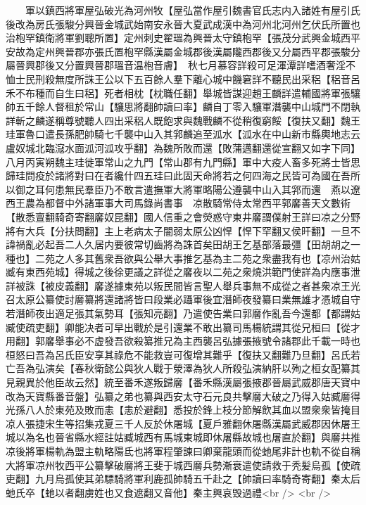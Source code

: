 　　軍以鎮西將軍屋弘破光為河州牧【屋弘當作屋引魏書官氏志内入諸姓有屋引氏後改為房氏張駿分興晉金城武始南安永晉大夏武成漢中為河州北河州乞伏氏所置也治枹罕鎮衛將軍劉聰所置】定州刺史翟瑥為興晉太守鎮枹罕【張茂分武興金城西平安故為定州興晉郡亦張氏置枹罕縣漢屬金城郡後漢屬隴西郡後又分屬西平郡張駿分屬晉興郡後又分置興晉郡瑥音温枹音膚】　秋七月慕容詳殺可足渾潭詳嗜酒奢淫不恤士民刑殺無度所誅王公以下五百餘人羣下離心城中饑窘詳不聽民出采稆【稆音呂禾不布種而自生曰稆】死者相枕【枕職任翻】舉城皆謀迎趙王麟詳遣輔國將軍張驤帥五千餘人督租於常山【驤思將翻帥讀曰率】麟自丁零入驤軍潛襲中山城門不閉執詳斬之麟遂稱尊號聽人四出采稆人既飽求與魏戰麟不從稍復窮餒【復扶又翻】魏王珪軍魯口遣長孫肥帥騎七千襲中山入其郛麟追至泒水【泒水在中山新市縣輿地志云盧奴城北臨滱水面泒河泒攻乎翻】為魏所敗而還【敗蒲邁翻還從宣翻又如字下同】八月丙寅朔魏主珪徙軍常山之九門【常山郡有九門縣】軍中大疫人畜多死將士皆思歸珪問疫於諸將對曰在者纔什四五珪曰此固天命將若之何四海之民皆可為國在吾所以御之耳何患無民羣臣乃不敢言遣撫軍大將軍略陽公遵襲中山入其郛而還　燕以遼西王農為都督中外諸軍事大司馬錄尚書事　凉散騎常侍太常西平郭黁善天文數術【散悉亶翻騎奇寄翻黁奴昆翻】國人信重之會熒惑守東井黁謂僕射王詳曰凉之分野將有大兵【分扶問翻】主上老病太子闇弱太原公凶悍【悍下罕翻又侯旰翻】一旦不諱禍亂必起吾二人久居内要彼常切齒將為誅首矣田胡王乞基部落最彊【田胡胡之一種也】二苑之人多其舊衆吾欲與公舉大事推乞基為主二苑之衆盡我有也【凉州治姑臧有東西苑城】得城之後徐更議之詳從之黁夜以二苑之衆燒洪範門使詳為内應事泄詳被誅【被皮義翻】黁遂據東苑以叛民間皆言聖人舉兵事無不成從之者甚衆凉王光召太原公纂使討黁纂將還諸將皆曰段業必躡軍後宜潛師夜發纂曰業無雄才憑城自守若潛師夜出適足張其氣勢耳【張知亮翻】乃遣使告業曰郭黁作亂吾今還都【都謂姑臧使疏吏翻】卿能决者可早出戰於是引還業不敢出纂司馬楊統謂其從兄桓曰【從才用翻】郭黁舉事必不虚發吾欲殺纂推兄為主西襲呂弘據張掖號令諸郡此千載一時也桓怒曰吾為呂氏臣安享其祿危不能救豈可復增其難乎【復扶又翻難乃旦翻】呂氏若亡吾為弘演矣【春秋衛懿公與狄人戰于滎澤為狄人所殺弘演納肝以殉之桓女配纂其見親異於他臣故云然】統至番禾遂叛歸黁【番禾縣漢屬張掖郡晉屬武威郡唐天寶中改為天寶縣番音盤】弘纂之弟也纂與西安太守石元良共擊黁大破之乃得入姑臧黁得光孫八人於東苑及敗而恚【恚於避翻】悉投於鋒上枝分節解飲其血以盟衆衆皆掩目凉人張捷宋生等招集戎夏三千人反於休屠城【夏戶雅翻休屠縣漢屬武威郡因休屠王城以為名也晉省縣水經註姑臧城西有馬城東城即休屠縣故城也屠直於翻】與黁共推凉後將軍楊軌為盟主軌略陽氐也將軍程肇諫曰卿棄龍頭而從虵尾非計也軌不從自稱大將軍凉州牧西平公纂擊破黁將王斐于城西黁兵勢漸衰遣使請救于秃髪烏孤【使疏吏翻】九月烏孤使其弟驃騎將軍利鹿孤帥騎五千赴之【帥讀曰率騎奇寄翻】秦太后虵氏卒【虵以者翻虜姓也又食遮翻又音他】秦主興哀毁過禮<br />
<br />
